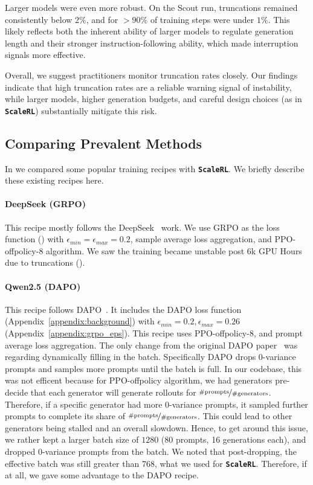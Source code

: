 \documentclass[]{fairmeta} %
\newcommand{\scalerl}{\texttt{\textbf{ScaleRL}}}
\begin{document}
Larger models were even more robust. 
On the Scout run, truncations remained consistently below $2\%$, and for $>90\%$ of training steps were under $1\%$. 
This likely reflects both the inherent ability of larger models to regulate generation length and their stronger instruction-following ability, which made interruption signals more effective. 

Overall, we suggest practitioners monitor truncation rates closely. 
Our findings indicate that high truncation rates are a reliable warning signal of instability, while larger models, higher generation budgets, and careful design choices (as in \scalerl) substantially mitigate this risk.






\subsection{Comparing Prevalent Methods}\label{appendix:prevelant_methods}
In  we compared some popular training recipes with \scalerl. We briefly describe these existing recipes here.

\paragraph{DeepSeek (GRPO)}
This recipe mostly follows the DeepSeek~\cite{guo2025deepseek} work. We use GRPO as the loss function () with $\epsilon_{min}=\epsilon_{max}=0.2$, sample average loss aggregation, and PPO-offpolicy-8 algorithm. We saw the training became unstable post 6k GPU Hours due to truncations ().

\paragraph{Qwen2.5 (DAPO)}
This recipe follows DAPO~\cite{yu2025dapo}. It includes the DAPO loss function (Appendix~\ref{appendix:background}) with $\epsilon_{min} = 0.2, \epsilon_{max}=0.26$ (Appendix~\ref{appendix:grpo_eps}). This recipe uses PPO-offpolicy-8, and prompt average loss aggregation. The only change from the original DAPO paper~\citep{yu2025dapo} was regarding dynamically filling in the batch. Specifically DAPO drops 0-variance prompts and samples more prompts until the batch is full. In our codebase, this was not efficent because for PPO-offpolicy algorithm, we had generators pre-decide that each generator will generate rollouts for $\nicefrac{\#\text{prompts}}{\#\text{generators}}$. Therefore, if a specific generator had more 0-variance prompts, it sampled further prompts to complete its share of $\nicefrac{\#\text{prompts}}{\#\text{generators}}$. This could lead to other generators being stalled and an overall slowdown. Hence, to get around this issue, we rather kept a larger batch size of $1280$ (80 prompts, 16 generations each), and dropped 0-variance prompts from the batch. We noted that post-dropping, the effective batch was still greater than 768, what we used for \scalerl. Therefore, if at all, we gave some advantage to the DAPO recipe.
\end{document}
